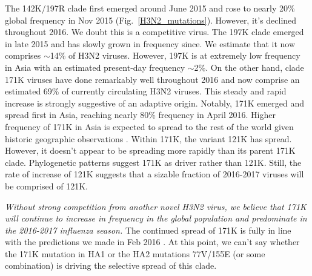 \documentclass[11pt,oneside,letterpaper]{article}
\begin{document}
The 142K/197R clade first emerged around June 2015 and rose to nearly 20\% global frequency in Nov 2015 (Fig.\ \ref{H3N2_mutations}). However, it's declined throughout 2016. We doubt this is a competitive virus. The 197K clade emerged in late 2015 and has slowly grown in frequency since. We estimate that it now comprises $\sim$14\% of H3N2 viruses. However, 197K is at extremely low frequency in Asia with an estimated present-day frequency $\sim$2\%. On the other hand, clade 171K viruses have done remarkably well throughout 2016 and now comprise an estimated 69\% of currently circulating H3N2 viruses. This steady and rapid increase is strongly suggestive of an adaptive origin. Notably, 171K emerged and spread first in Asia, reaching nearly 80\% frequency in April 2016. Higher frequency of 171K in Asia is expected to spread to the rest of the world given historic geographic observations \cite{bedford2015global}. Within 171K, the variant 121K has spread. However, it doesn't appear to be spreading more rapidly than its parent 171K clade. Phylogenetic patterns suggest 171K as driver rather than 121K. Still, the rate of increase of 121K suggests that a sizable fraction of 2016-2017 viruses will be comprised of 121K.


\pagebreak

\textit{Without strong competition from another novel H3N2 virus, we believe that 171K will continue to increase in frequency in the global population and predominate in the 2016-2017 influenza season.} The continued spread of 171K is fully in line with the predictions we made in Feb 2016 \cite{feb2016report}. At this point, we can't say whether the 171K mutation in HA1 or the HA2 mutations 77V/155E (or some combination) is driving the selective spread of this clade.
\end{document}
